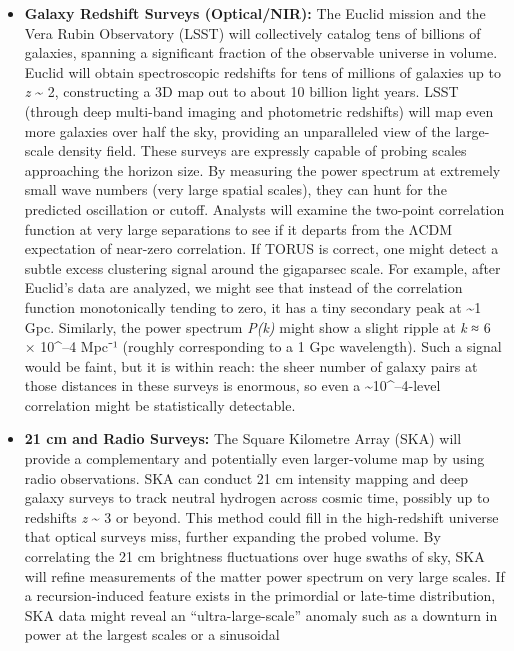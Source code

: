 \documentclass[
]{article}
\begin{document}
\begin{itemize}
\item
  \textbf{Galaxy Redshift Surveys (Optical/NIR):} The Euclid mission and
  the Vera Rubin Observatory (LSST) will collectively catalog tens of
  billions of galaxies, spanning a significant fraction of the
  observable universe in volume. Euclid will obtain spectroscopic
  redshifts for tens of millions of galaxies up to \emph{z}
  \textasciitilde{} 2, constructing a 3D map out to about 10 billion
  light years. LSST (through deep multi-band imaging and photometric
  redshifts) will map even more galaxies over half the sky, providing an
  unparalleled view of the large-scale density field. These surveys are
  expressly capable of probing scales approaching the horizon size. By
  measuring the power spectrum at extremely small wave numbers (very
  large spatial scales), they can hunt for the predicted oscillation or
  cutoff. Analysts will examine the two-point correlation function at
  very large separations to see if it departs from the ΛCDM expectation
  of near-zero correlation. If TORUS is correct, one might detect a
  subtle excess clustering signal around the gigaparsec scale. For
  example, after Euclid's data are analyzed, we might see that instead
  of the correlation function monotonically tending to zero, it has a
  tiny secondary peak at \textasciitilde1 Gpc. Similarly, the power
  spectrum \emph{P(k)} might show a slight ripple at \emph{k} ≈ 6 ×
  10\^{}--4 Mpc⁻¹ (roughly corresponding to a 1 Gpc wavelength). Such a
  signal would be faint, but it is within reach: the sheer number of
  galaxy pairs at those distances in these surveys is enormous, so even
  a \textasciitilde10\^{}--4-level correlation might be statistically
  detectable.
\item
  \textbf{21 cm and Radio Surveys:} The Square Kilometre Array (SKA)
  will provide a complementary and potentially even larger-volume map by
  using radio observations. SKA can conduct 21 cm intensity mapping and
  deep galaxy surveys to track neutral hydrogen across cosmic time,
  possibly up to redshifts \emph{z} \textasciitilde{} 3 or beyond. This
  method could fill in the high-redshift universe that optical surveys
  miss, further expanding the probed volume. By correlating the 21 cm
  brightness fluctuations over huge swaths of sky, SKA will refine
  measurements of the matter power spectrum on very large scales. If a
  recursion-induced feature exists in the primordial or late-time
  distribution, SKA data might reveal an ``ultra-large-scale'' anomaly
  such as a downturn in power at the largest scales or a sinusoidal

\end{itemize}
\end{document}
